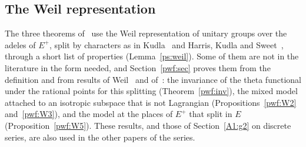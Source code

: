 \documentclass[10pt]{amsart}
\theoremstyle{definition}
\theoremstyle{remark}
\begin{document}
\subsection*{The Weil representation}
The three theorems of~\cite{P46} use the Weil representation of unitary groups over the adeles of
$E^+$, split by characters as in Kudla~\cite{KudlaSplitting} and Harris, Kudla and
Sweet~\cite{HKS}, through a short list of properties (Lemma~\ref{ps:weil}). Some of them are not
in the literature in the form needed, and Section~\ref{pwf:sec} proves them from the definition
and from results of Weil~\cite{WeilActa} and of~\cite{KudlaSplitting}: the invariance of the theta
functional under the rational points for this splitting (Theorem~\ref{pwf:inv}), the mixed model
attached to an isotropic subspace that is not Lagrangian (Propositions~\ref{pwf:W2}
and~\ref{pwf:W3}), and the model at the places of $E^+$ that split in $E$
(Proposition~\ref{pwf:W5}). These results, and those of Section~\ref{A1:g2}
on discrete series, are also used in the other papers of the series.
\end{document}
